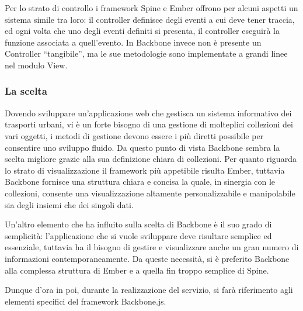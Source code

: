 Per lo strato di controllo i framework Spine e Ember offrono per alcuni aspetti un sistema simile tra loro: il controller definisce degli eventi a cui deve tener traccia, ed ogni volta che uno degli eventi definiti si presenta, il controller eseguirà la funzione associata a quell'evento. In Backbone invece non è presente un Controller ``tangibile'', ma le sue metodologie sono implementate a grandi linee nel modulo View.

\subsubsection{La scelta} %
\label{ssub:la_scelta}
Dovendo sviluppare un'applicazione web che gestisca un sistema informativo dei trasporti urbani, vi è un forte bisogno di una gestione di molteplici collezioni dei vari oggetti, i metodi di gestione devono essere i più diretti possibile per consentire uno sviluppo fluido. Da questo punto di vista Backbone sembra la scelta migliore grazie alla sua definizione chiara di collezioni.
Per quanto riguarda lo strato di visualizzazione il framework più appetibile risulta Ember, tuttavia Backbone fornisce una struttura chiara e concisa la quale, in sinergia con le collezioni, consente una visualizzazione altamente personalizzabile e manipolabile sia degli insiemi che dei singoli dati.

Un'altro elemento che ha influito sulla scelta di Backbone è il suo grado di semplicità: l'applicazione che si vuole sviluppare deve risultare semplice ed essenziale, tuttavia ha il bisogno di gestire e visualizzare anche un gran numero di informazioni contemporaneamente.
Da queste necessità, si è preferito Backbone alla complessa struttura di Ember e a quella fin troppo semplice di Spine.

Dunque d'ora in poi, durante la realizzazione del servizio, si farà riferimento agli elementi specifici del framework Backbone.js.


\newpage